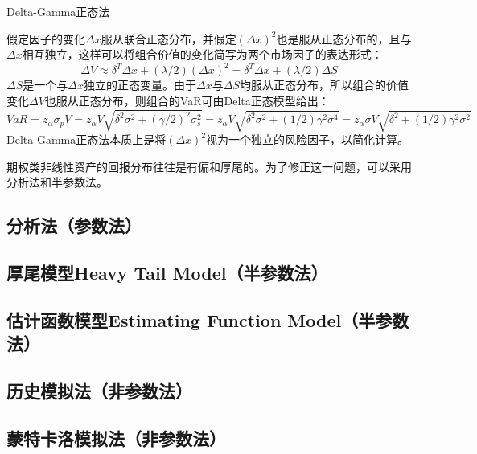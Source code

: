\documentclass[UTF8]{ctexart}
\newcommand \qd[1] {\begin{qds} {#1} \end{qds}}
\begin{document}
\qd{Delta-Gamma正态法}假定因子的变化$\Delta x$服从联合正态分布，并假定$(\Delta x)^2$也是服从正态分布的，且与$\Delta x$相互独立，这样可以将组合价值的变化简写为两个市场因子的表达形式：
$$\Delta V \approx \delta^T \Delta x+(\lambda /2)(\Delta x)^2= \delta^T \Delta x+(\lambda /2)\Delta S$$
$\Delta S$是一个与$\Delta x$独立的正态变量。由于$\Delta x$与$\Delta S$均服从正态分布，所以组合的价值变化$\Delta V$也服从正态分布，则组合的VaR可由Delta正态模型给出：
$$VaR
=z_{\alpha} \sigma_p V
=z_{\alpha} V \sqrt{\delta^2 \sigma^2+(\gamma /2)^2 \sigma_s^2}
=z_{\alpha} V \sqrt{\delta^2 \sigma^2+(1/2)\gamma^2 \sigma^4}
=z_{\alpha} \sigma V \sqrt{\delta^2 +(1/2)\gamma^2 \sigma^2}$$
Delta-Gamma正态法本质上是将$(\Delta x)^2$视为一个独立的风险因子，以简化计算。

期权类非线性资产的回报分布往往是有偏和厚尾的。为了修正这一问题，可以采用分析法和半参数法。

\subsection{分析法（参数法）}

\subsection{厚尾模型Heavy Tail Model（半参数法）}

\subsection{估计函数模型Estimating Function Model（半参数法）}

\subsection{历史模拟法（非参数法）}

\subsection{蒙特卡洛模拟法（非参数法）}
\end{document}
